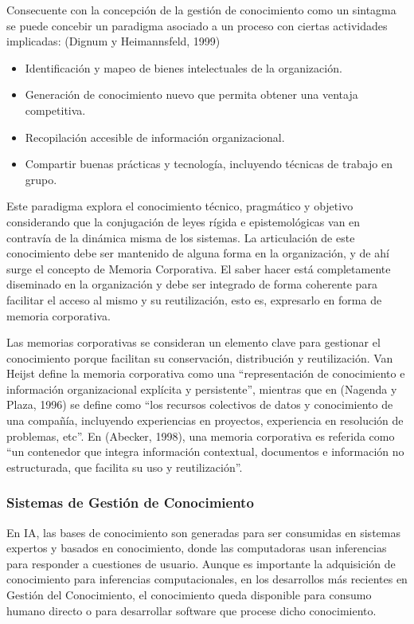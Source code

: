 Consecuente con la concepción de la gestión de conocimiento como un sintagma se puede concebir un paradigma asociado a un proceso con ciertas actividades implicadas: (Dignum y Heimannsfeld, 1999) 

\begin{itemize}
\item Identificación y mapeo de bienes intelectuales de la organización.
\item Generación de conocimiento nuevo que permita obtener una ventaja competitiva. 
\item Recopilación accesible de información organizacional. 
\item Compartir buenas prácticas y tecnología, incluyendo técnicas de trabajo en grupo.
\end{itemize}

Este paradigma explora el conocimiento técnico, pragmático y objetivo considerando que la conjugación de leyes rígida e epistemológicas van en contravía de la dinámica misma de los sistemas. La articulación de este conocimiento debe ser mantenido de alguna forma en la organización, y de ahí surge el concepto de Memoria Corporativa. El saber hacer está completamente diseminado en la organización y debe ser integrado de forma coherente para facilitar el acceso al mismo y su reutilización, esto es, expresarlo en forma de memoria corporativa. 

Las memorias corporativas se consideran un elemento clave para gestionar el conocimiento porque facilitan su conservación, distribución y reutilización. Van Heijst define la memoria corporativa como una “representación de conocimiento e información organizacional explícita y persistente”, mientras que en (Nagenda y Plaza, 1996) se define como “los recursos colectivos de datos y conocimiento de una compañía, incluyendo experiencias en proyectos, experiencia en resolución de problemas, etc”. En (Abecker, 1998), una memoria corporativa es referida como “un contenedor que integra información contextual, documentos e información no estructurada, que facilita su uso y reutilización”.

%

\subsubsection{Sistemas de Gestión de Conocimiento}

En IA, las bases de conocimiento son generadas para ser consumidas en sistemas expertos y basados en conocimiento, donde las computadoras usan inferencias para responder a cuestiones de usuario. Aunque es importante la adquisición de conocimiento para inferencias computacionales, en los desarrollos más recientes en Gestión del Conocimiento, el conocimiento queda disponible para consumo humano directo o para desarrollar software que procese dicho conocimiento. 

